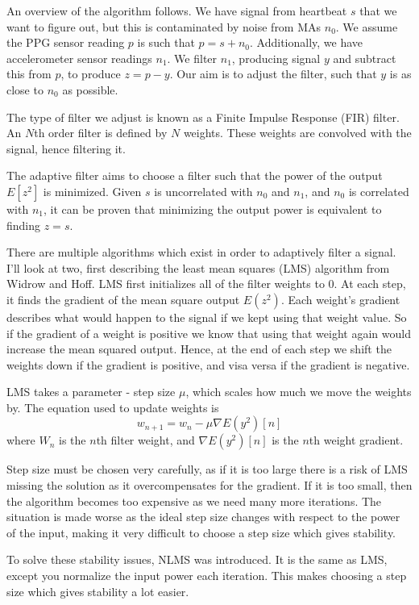 \documentclass[12pt,a4paper,twoside,openright]{report}
\begin{document}
An overview of the algorithm follows. We have signal from heartbeat \(s\) that
we want to figure out, but this is contaminated by noise from MAs \(n_0\).
We assume the PPG sensor reading \(p\) is such that \(p=s+n_0\). Additionally,
we have accelerometer sensor readings \(n_1\). We filter \(n_1\), producing
signal \(y\) and subtract this from \(p\), to produce \(z=p-y\). Our aim is to
adjust the filter, such that \(y\) is as close to \(n_0\) as possible. 

The type of filter we adjust is known as a Finite Impulse Response (FIR)
filter. An \(N\)th order filter is defined by \(N\) weights.
These weights are convolved with the signal, hence filtering it.

The adaptive filter aims to choose a filter such that the power of the output 
\(E[z^2]\) is minimized. Given \(s\) is uncorrelated with \(n_0\) and \(n_1\), and \(n_0\)
is correlated with \(n_1\), it can be proven that minimizing the output power
is equivalent to finding \(z=s\).

There are multiple algorithms which exist in order to adaptively filter a
signal. I'll look at two, first describing the least mean squares (LMS) algorithm from
Widrow and Hoff. LMS first initializes all of the filter weights to 0. At each
step, it finds the gradient of the mean square output \(E(z^2)\).
Each weight's gradient describes what would happen to the signal if we kept
using that weight value. So if the gradient of a weight is positive we know
that using that weight again would increase the mean squared output. Hence, at
the end of each step we shift the weights down if the gradient is positive,
and visa versa if the gradient is negative.

LMS takes a parameter - step size \(\mu\), which scales how much we move the
weights by. The equation used to update weights is \[w_{n+1}=w_n-\mu \nabla
E(y^2)[n]\]
where \(W_n\) is the \(n\)th filter weight, and \(\nabla E(y^2)[n]\) is the
\(n\)th weight gradient.

Step size must be chosen very carefully, as if it is too large there is a risk
of LMS missing the solution as it overcompensates for the gradient. If it is
too small, then the algorithm becomes too expensive as we need many more
iterations. The situation is made worse as the ideal step size changes with
respect to the power of the input, making it very difficult to choose a step
size which gives stability.

To solve these stability issues, NLMS was introduced. It is the same as LMS, except you normalize the input power each
iteration. This makes choosing a step size which gives stability a lot easier.
\end{document}
